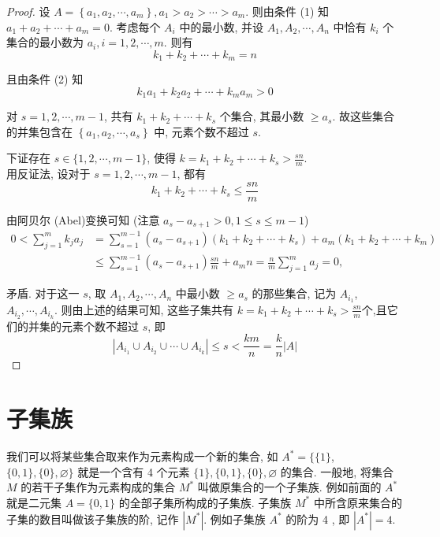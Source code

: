 \begin{proof}
	设 $A=\left\{a_{1}, a_{2}, \cdots, a_{m}\right\}, a_{1}>a_{2}>\cdots>a_{m}$. 则由条件 (1) 知 $a_{1}+a_{2}+\cdots+a_{m}=0$. 考虑每个 $A_{i}$ 中的最小数, 并设 $A_{1}, A_{2}, \cdots, A_{n}$ 中恰有 $k_{i}$ 个集合的最小数为 $a_{i}, i=1,2, \cdots, m$. 则有
	$$
		k_{1}+k_{2}+\cdots+k_{m}=n
	$$

	且由条件 (2) 知
	$$
		k_{1} a_{1}+k_{2} a_{2}+\cdots+k_{m} a_{m}>0
	$$

	对 $s=1,2, \cdots, m-1$, 共有 $k_{1}+k_{2}+\cdots+k_{s}$ 个集合, 其最小数 $\geqslant a_{s}$. 故这些集合的并集包含在 $\left\{a_{1}, a_{2}, \cdots, a_{s}\right\}$ 中, 元素个数不超过 $s$.

	下证存在 $s \in\{1,2, \cdots, m-1\}$, 使得 $k=k_{1}+k_{2}+\cdots+k_{s}>\frac{s n}{m}$.\\
	用反证法, 设对于 $s=1,2, \cdots, m-1$, 都有
	$$
		k_{1}+k_{2}+\cdots+k_{s} \leqslant \frac{s n}{m}
	$$

	由阿贝尔 (Abel)变换可知 (注意 $a_{s}-a_{s+1}>0,1 \leqslant s \leqslant m-1$)
	$$
		\begin{aligned}
			0<\sum_{j=1}^{m} k_{j} a_{j} & =\sum_{s=1}^{m-1}\left(a_{s}-a_{s+1}\right)\left(k_{1}+k_{2}+\cdots+k_{s}\right)+a_{m}\left(k_{1}+k_{2}+\cdots+k_{m}\right) \\
			                             & \leqslant \sum_{s=1}^{m-1}\left(a_{s}-a_{s+1}\right) \frac{s n}{m}+a_{m} n=\frac{n}{m} \sum_{j=1}^{m} a_{j}=0,
		\end{aligned}
	$$

	矛盾. 对于这一 $s$, 取 $A_{1}, A_{2}, \cdots, A_{n}$ 中最小数 $\geqslant a_{s}$ 的那些集合, 记为 $A_{i_{1}}$, $A_{i_{2}}, \cdots, A_{i_{k}}$. 则由上述的结果可知, 这些子集共有 $k=k_{1}+k_{2}+\cdots+k_{s}>\frac{s n}{m}$个,且它们的并集的元素个数不超过 $s$, 即
	$$
		\left|A_{i_{1}} \cup A_{i_{2}} \cup \cdots \cup A_{i_{k}}\right| \leqslant s<\frac{k m}{n}=\frac{k}{n}|A|
	$$
\end{proof}

\section{子集族}
我们可以将某些集合取来作为元素构成一个新的集合, 如 $A^{*}=\{\{1\}$, $\{0,1\},\{0\}, \varnothing\}$ 就是一个含有 4 个元素 $\{1\}, \{0,1\}, \{0\}, \varnothing$ 的集合. 一般地, 将集合 $M$ 的若干子集作为元素构成的集合 $M^{*}$ 叫做原集合的一个子集族. 例如前面的 $A^{*}$ 就是二元集 $A=\{0,1\}$ 的全部子集所构成的子集族. 子集族 $M^{*}$ 中所含原来集合的子集的数目叫做该子集族的阶, 记作 $\left|M^{*}\right|$. 例如子集族 $A^{*}$ 的阶为 4 , 即 $\left|A^{*}\right|=4$.

